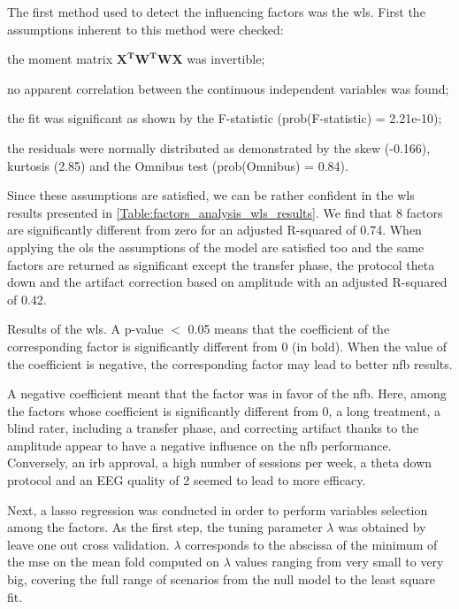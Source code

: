 The first method used to detect the influencing factors was the \gls{wls}. First the assumptions inherent to this method were checked: 
\begin{description}
	\item the moment matrix $\mathbf{{X}^{T}W^{T}WX}$ was invertible;
  \item no apparent correlation between the continuous independent variables was found; 
  \item the fit was significant as shown by the F-statistic (prob(F-statistic) = 2.21e-10); 
  \item the residuals were normally distributed as demonstrated by the skew (-0.166), kurtosis (2.85) and the Omnibus test (prob(Omnibus) = 0.84).
\end{description}

Since these assumptions are satisfied, we can be rather confident in the \gls{wls} results presented in \cref{Table:factors_analysis_wls_results}. 
We find that 8 factors are significantly different from zero for an adjusted R-squared of 0.74. When applying the \gls{ols} the assumptions of the 
model are satisfied too and the same factors are returned as significant except the transfer phase, 
the protocol theta down and the artifact correction based on amplitude with an adjusted R-squared of 0.42. 

\begin{table}[h!]
  \centering
  \caption{Results of the \gls{wls}. A p-value $<$ 0.05 means that the coefficient of the corresponding factor is significantly different from $0$ (in bold). 
	When the value of the coefficient is negative, the corresponding factor may lead to better \gls{nfb} results.}
  
  \label{Table:factors_analysis_wls_results}
\end{table}

A negative coefficient meant that the factor was in favor of the \gls{nfb}. Here, among the factors whose coefficient is significantly 
different from 0, a long treatment, a blind rater, including a transfer phase, and correcting artifact thanks to the amplitude appear 
to have a negative influence on the \gls{nfb} performance. Conversely, an \gls{irb} approval, a high number of sessions per week, a theta
down protocol and an EEG quality of 2 seemed to lead to more efficacy. 

Next, a \gls{lasso} regression was conducted in order to perform variables selection among the factors. As the first step, the tuning 
parameter $\lambda$ was obtained by leave one out cross validation. 
$\lambda$ corresponds to the abscissa of the minimum of the \gls{mse} on the mean fold computed on $\lambda$ values ranging from very 
small to very big, covering the full range of scenarios from the null model to the least square fit.

